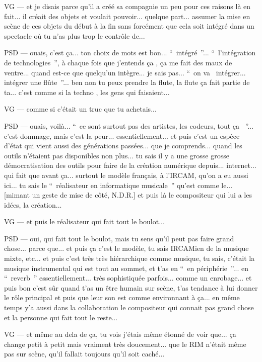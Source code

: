 VG — et je disais parce qu'il a créé sa compagnie un peu pour ces raisons là en fait... il créait des objets et voulait pouvoir... quelque part... assumer la mise en scène de ces objets du début à la fin sans forcément que cela soit intégré dans un spectacle où tu n'as plus trop le contrôle de...

PSD — ouais, c'est ça... ton choix de mots est bon... “ intégré ”... “ l'intégration de technologies ”,  à chaque fois que j'entends ça , ça me fait des maux de ventre... quand est-ce que quelqu'un intègre... je sais pas... “ on va  intégrer... intégrer une flûte ”... ben non tu peux prendre la flute, la flute ça fait partie de ta... c'est comme si la techno , les gens qui faisaient...

VG — comme si c'était un truc que tu achetais...

PSD — ouais, voilà... “ ce sont surtout pas des artistes, les codeurs, tout ça  ”... c'est dommage, mais c'est la peur... essentiellement... et puis c'est un espèce d'état qui vient aussi des générations passées... que je comprends... quand les outils n'étaient pas disponibles non plus... tu sais il y a une grosse grosse démocratisation des outils pour faire de la création numérique depuis... internet... qui fait que avant ça... surtout le modèle français, à l'IRCAM, qu'on a eu aussi ici... tu sais le “ réalisateur en informatique musicale ” qu'est comme le... [mimant un geste de mise de côté, N.D.R.] et puis là le compositeur qui lui a les idées, la création...

VG — et puis le réalisateur qui fait tout le boulot...

PSD — oui, qui fait tout le boulot, mais tu sens qu'il peut pas faire grand chose... parce que... et puis ça c'est le modèle, tu sais IRCAMien de la musique mixte, etc... et puis c'est très très hiérarchique comme musique, tu sais, c'était la musique instrumental qui est tout au sommet, et t'as en “ en périphérie ”... en “ reverb ” essentiellement... très sophistiquée parfois... comme un enrobage... et puis bon c'est sûr quand t'as un être humain sur scène, t'as tendance à lui donner le rôle principal et puis que leur son est comme environnant à ça... en même temps y'a aussi dans la collaboration le compositeur qui connait pas grand chose et la personne qui fait tout le reste...

VG — et même au dela de ça, tu vois j'étais même étonné de voir que... ça change petit à petit mais vraiment très doucement... que le RIM n'était même pas sur scène, qu'il fallait toujours qu'il soit caché...

